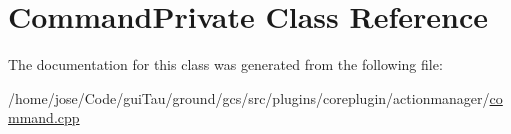 \hypertarget{class_command_private}{\section{Command\-Private Class Reference}
\label{class_command_private}
}


The documentation for this class was generated from the following file\-:\begin{DoxyCompactItemize}
\item 
/home/jose/\-Code/gui\-Tau/ground/gcs/src/plugins/coreplugin/actionmanager/\hyperlink{command_8cpp}{command.\-cpp}\end{DoxyCompactItemize}
